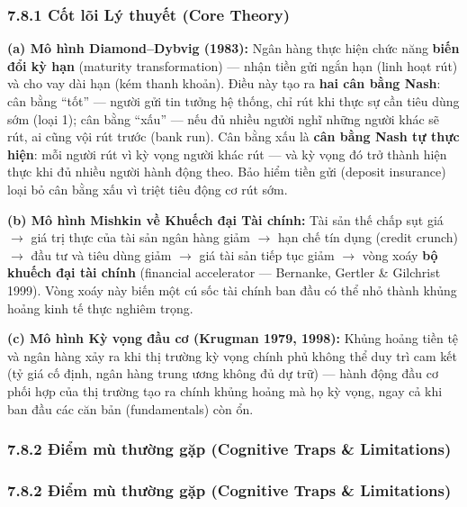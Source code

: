 \documentclass[
]{article}
\begin{document}
\subsubsection{7.8.1 Cốt lõi Lý thuyết (Core
Theory)}\label{cux1ed1t-luxf5i-luxfd-thuyux1ebft-core-theory-23}

\textbf{(a) Mô hình Diamond--Dybvig (1983):} Ngân hàng thực hiện chức
năng \textbf{biến đổi kỳ hạn} (maturity transformation) --- nhận tiền
gửi ngắn hạn (linh hoạt rút) và cho vay dài hạn (kém thanh khoản). Điều
này tạo ra \textbf{hai cân bằng Nash}: cân bằng ``tốt'' --- người gửi
tin tưởng hệ thống, chỉ rút khi thực sự cần tiêu dùng sớm (loại 1); cân
bằng ``xấu'' --- nếu đủ nhiều người nghĩ những người khác sẽ rút, ai
cũng vội rút trước (bank run). Cân bằng xấu là \textbf{cân bằng Nash tự
thực hiện}: mỗi người rút vì kỳ vọng người khác rút --- và kỳ vọng đó
trở thành hiện thực khi đủ nhiều người hành động theo. Bảo hiểm tiền gửi
(deposit insurance) loại bỏ cân bằng xấu vì triệt tiêu động cơ rút sớm.

\textbf{(b) Mô hình Mishkin về Khuếch đại Tài chính:} Tài sản thế chấp
sụt giá \(\rightarrow\) giá trị thực của tài sản ngân hàng giảm
\(\rightarrow\) hạn chế tín dụng (credit crunch) \(\rightarrow\) đầu tư
và tiêu dùng giảm \(\rightarrow\) giá tài sản tiếp tục giảm
\(\rightarrow\) vòng xoáy \textbf{bộ khuếch đại tài chính} (financial
accelerator --- Bernanke, Gertler \& Gilchrist 1999). Vòng xoáy này biến
một cú sốc tài chính ban đầu có thể nhỏ thành khủng hoảng kinh tế thực
nghiêm trọng.

\textbf{(c) Mô hình Kỳ vọng đầu cơ (Krugman 1979, 1998):} Khủng hoảng
tiền tệ và ngân hàng xảy ra khi thị trường kỳ vọng chính phủ không thể
duy trì cam kết (tỷ giá cố định, ngân hàng trung ương không đủ dự trữ)
--- hành động đầu cơ phối hợp của thị trường tạo ra chính khủng hoảng mà
họ kỳ vọng, ngay cả khi ban đầu các căn bản (fundamentals) còn ổn.

\subsubsection{7.8.2 Điểm mù thường gặp (Cognitive Traps \&
Limitations)}\label{ux111iux1ec3m-muxf9-thux1b0ux1eddng-gux1eb7p-cognitive-traps-limitations-45}

\subsubsection{7.8.2 Điểm mù thường gặp (Cognitive Traps \&
Limitations)}\label{ux111iux1ec3m-muxf9-thux1b0ux1eddng-gux1eb7p-cognitive-traps-limitations-46}
\end{document}
